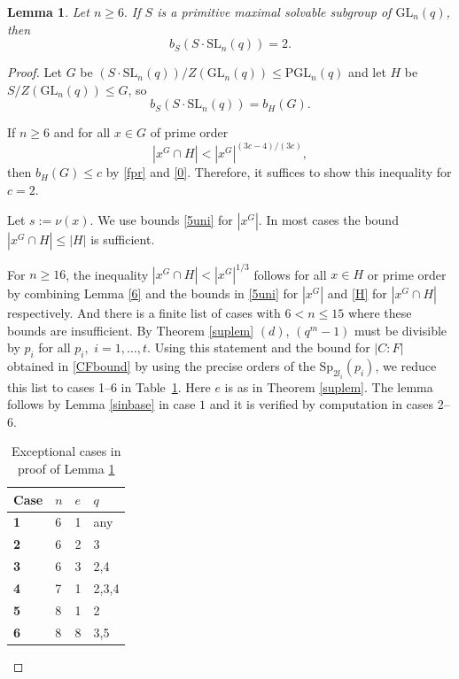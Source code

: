 \documentclass[a4paper,reqno,11pt]{amsart}
\newtheorem{Lem}[Th]{Lemma}
\theoremstyle{definition}
\theoremstyle{remark}
\numberwithin{equation}{section}
\newcommand{\SL}{{\mathrm{SL}}}
\newcommand{\GL}{{\mathrm{GL}}}
\newcommand{\PGL}{{\mathrm{PGL}}}
\newcommand{\Sp}{{\mathrm{Sp}}}
\begin{document}
\begin{Lem}\label{sch} 
 Let $n \ge 6.$ If $S$ is a primitive maximal solvable  subgroup of $\GL_n(q)$, then $$b_S(S \cdot \SL_n(q)) = 2.$$ 
\end{Lem}
\begin{proof}

Let   $G$ be $(S \cdot \SL_n(q))/Z(\GL_n(q))\le \PGL_n(q)$ and let $H$ be $S/Z(\GL_n(q))\le G$, so 
$$b_S(S \cdot \SL_n(q))=b_H(G).$$

If $n \ge 6$ and for all $x \in G$ of prime order   
$$|x^G \cap H| < |x^G|^{(3c-4)/(3c)},$$
then $b_H(G) \le c$ by  \eqref{fpr}  and \eqref{0}. Therefore,  it suffices to show this inequality for $c=2$. 


Let $s:=\nu(x).$ We use bounds  \eqref{5uni} for $|x^G|.$
In most cases the bound $|x^G \cap H| \le |H|$ is sufficient. 

For $n \ge 16$, the inequality $|x^G \cap H| < |x^G|^{1/3}$ follows for all $x \in H$ or prime order by combining  Lemma \ref{6} and the bounds   in \eqref{5uni} for $|x^G|$ and \eqref{H} for $|x^G \cap H|$ respectively. And there is a finite list of cases with $6 <n \le 15$ where these bounds  are insufficient. By  Theorem \ref{suplem} $(d)$,   $(q^m-1)$ must be divisible by $p_i$ for all $p_i,$ $i=1, \ldots, t.$ Using this statement and the bound for $|C:F|$ obtained in \eqref{CFbound} by using the precise orders of the $\Sp_{2l_i}(p_i)$, we reduce this list to  cases 1--6 in Table~\ref{tab}. Here $e$ is as in Theorem \ref{suplem}. %
The lemma follows by Lemma \ref{sinbase} in case $1$ and it is verified by computation  in cases 2--6. 
\begin{table}[h]
\centering
\caption{Exceptional cases in proof of Lemma \ref{sch}}
\label{tab}
\begin{tabular}{|l|l|l|l|}
\hline
\textbf{Case} & $n$ & $e$ & $q$   \\ \hline
\textbf{1}  & 6   & 1   & any   \\ \hline
\textbf{2}  & 6   & 2   & 3     \\ \hline
\textbf{3}  & 6   & 3   & 2,4 \\ \hline
\textbf{4}  & 7   & 1   & 2,3,4 \\ \hline
\textbf{5}  & 8   & 1   & 2     \\ \hline
\textbf{6}  & 8   & 8   & 3,5    \\ \hline
\end{tabular}
\end{table} 
\end{proof}
\end{document}
